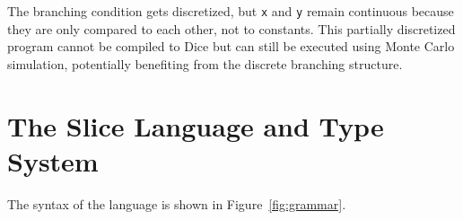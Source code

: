 \documentclass[acmsmall,screen,dvipsnames,x11names,nonacm,anonymous,review]{acmart}
\newcommand{\Slice}{\text{\scshape Slice}\xspace}
\begin{document}
\noindent The branching condition gets discretized, but \texttt{x} and \texttt{y} remain continuous because they are only compared to each other, not to constants. This partially discretized program cannot be compiled to Dice but can still be executed using Monte Carlo simulation, potentially benefiting from the discrete branching structure.









\section{The Slice Language and Type System}\label{sec:language}

The syntax of the \Slice language is shown in Figure~\ref{fig:grammar}.
\end{document}
